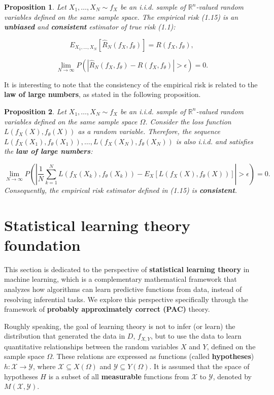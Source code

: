\documentclass{report}
\newtheorem{proposition}{Proposition}[chapter]
\begin{document}
\begin{proposition}
Let $X_1,\dots,X_N \sim f_X$ be an i.i.d. sample of $\mathbb{R}^n$-valued random variables defined on the same sample space. The empirical risk (1.15) is an \textbf{unbiased} and \textbf{consistent} estimator of true risk (1.1):

\begin{equation}
E_{X_1,...,X_N}[\hat{R}_N(f_X,f_\theta)] = R(f_X,f_\theta),
\end{equation}

\begin{equation}
\lim_{N\to \infty}P(|\hat{R}_N(f_X,f_\theta)-R(f_X,f_\theta)| > \epsilon) = 0.
\end{equation}
\end{proposition}
It is interesting to note that the consistency of the empirical risk is related to the \textbf{law of large numbers}, as stated in the following proposition.

\begin{proposition}
Let $X_1,\dots,X_N \sim f_X$ be an i.i.d. sample of $\mathbb{R}^n$-valued random variables defined on the same sample space $\Omega$. Consider the loss function $L(f_X(X), f_\theta(X))$ as a random variable. Therefore, the sequence $L(f_X(X_1),f_\theta(X_1)),\dots,L(f_X(X_N),f_\theta(X_N))$ is also i.i.d. and satisfies the \textbf{law of large numbers}:

\begin{equation}
\lim_{N\to \infty}P\left(\left|\frac{1}{N}\sum_{k=1}^NL(f_X(X_k),f_\theta(X_k)) - E_{X}[L(f_X(X),f_\theta(X))]\right| > \epsilon\right) = 0.
\end{equation}
Consequently, the empirical risk estimator defined in (1.15) is \textbf{consistent}.
\end{proposition}

\section{Statistical learning theory foundation}
This section is dedicated to the perspective of \textbf{statistical learning theory} in machine learning, which is a complementary mathematical framework that analyzes how algorithms can learn predictive functions from data, instead of resolving inferential tasks. We explore this perspective specifically through the framework of \textbf{probably approximately correct (PAC)} theory.

Roughly speaking, the goal of learning theory is not to infer (or learn) the distribution that generated the data in $D$, $f_{X,Y}$, but to use the data to learn quantitative relationships between the random variables $X$ and $Y$, defined on the sample space $\Omega$. These relations are expressed as functions (called \textbf{hypotheses}) $h : \mathcal{X} \to \mathcal{Y}$, where $\mathcal{X} \subseteq X(\Omega)$ and $\mathcal{Y} \subseteq Y(\Omega)$. It is assumed that the space of hypotheses $H$ is a subset of all \textbf{measurable} functions from $\mathcal{X}$ to $\mathcal{Y}$, denoted by $M(\mathcal{X}, \mathcal{Y})$.
\end{document}
